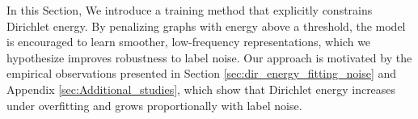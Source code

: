 




In this Section, We introduce a training method that explicitly constrains Dirichlet energy. By penalizing graphs with energy above a threshold, the model is encouraged to learn smoother, low-frequency representations, which we hypothesize improves robustness to label noise. Our approach is motivated by the empirical observations presented in Section \ref{sec:dir_energy_fitting_noise} and Appendix \ref{sec:Additional_studies}, which show that Dirichlet energy increases under overfitting and grows proportionally with label noise. 

